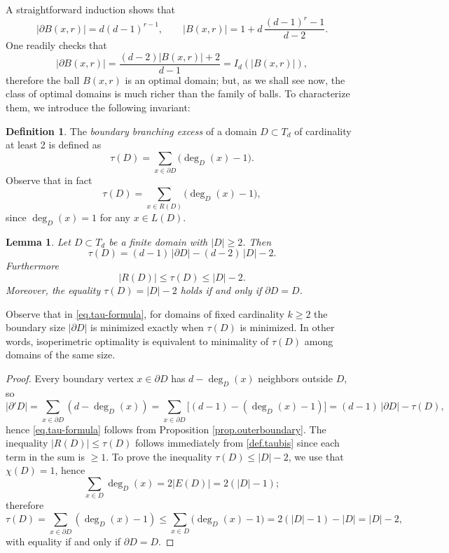 \documentclass[a4paper, 11pt]{article}
\numberwithin{equation}{section}
\newtheorem{lemma}[theorem]{Lemma}
\theoremstyle{definition}
\newtheorem{definition}[theorem]{Definition}
\theoremstyle{remark}
\begin{document}
A straightforward induction shows that
\[
|\partial B(x,r)| = d(d-1)^{r-1}, \qquad |B(x,r)| = 1 + d\,\frac{(d-1)^r - 1}{d-2}.
\]
One readily checks that
\[
|\partial B(x,r)| = \frac{(d-2)|B(x,r)| + 2}{d-1} = I_d\left( |B(x,r)| \right), 
\]
therefore the ball $B(x,r)$ is an optimal domain; but, as we shall see now, the class of optimal domains is much richer than the family of balls. To characterize them, we introduce the following invariant:
\begin{definition}
The \emph{boundary branching excess} of a domain $D\subset T_d$ of cardinality at least 2 is defined as 
\begin{equation}\label{def.tau}
  \tau(D) = \sum_{x\in\partial D} \bigl(\deg_D(x)-1\bigr).
\end{equation}
Observe that in fact 
\begin{equation}\label{def.taubis}
  \tau(D) = \sum_{x\in R(D)} \bigl(\deg_D(x)-1\bigr),
\end{equation}
since $\deg_D(x) = 1$ for any $x\in L(D)$.
\end{definition}

 
\medskip 

\begin{lemma}\label{lem.tau-formula}
Let $D\subset T_d$ be a finite  domain with $|D| \geq 2$. Then
\begin{equation}\label{eq.tau-formula}
  \tau(D)  = (d-1)\,|\partial D| - (d-2)\,|D| - 2.
\end{equation}
Furthermore 
\begin{equation}\label{inequtau1}
  |R(D)| \leq  \tau(D)  \leq |D| -2.
\end{equation}
Moreover, the equality $\tau(D)  =  |D| -2$ holds  if and only if $\partial D=D$.
\end{lemma}


\smallskip 

Observe that in \eqref{eq.tau-formula}, for domains of fixed cardinality  $k \geq 2$ the boundary size $|\partial D|$ is  minimized exactly when $\tau(D)$ is minimized. In other words, isoperimetric optimality is equivalent to minimality of $\tau(D)$ among domains of the same size.



\begin{proof}   Every boundary vertex $x\in\partial D$ has $d-\deg_D(x)$
neighbors outside $D$, so
\[
  |\partial' D| = \sum_{x\in\partial D} (d-\deg_D(x))
    = \sum_{x\in\partial D} \bigl[(d-1) - (\deg_D(x)-1)\bigr]
    = (d-1)\,|\partial D| - \tau(D),
\]
hence \eqref{eq.tau-formula} follows from Proposition \ref{prop.outerboundary}.
The inequality $|R(D)| \leq  \tau(D)$ follows immediately from \eqref{def.taubis} since each term in the sum is $\geq1$.  To prove the inequality   $\tau(D)  \leq |D| -2$, we use that $ \chi(D) = 1$, hence 
$$
 \sum_{x\in D}\deg_D(x)=2|E(D)|=2(|D|-1);
$$
therefore  
$$
 \tau(D)   = \sum_{x\in \partial D} (\deg_D(x)-1) \leq \sum_{x\in D}\bigl(\deg_D(x)-1\bigr) =2(|D|-1)-|D| =|D|-2,
$$
with equality  if and only if $\partial D=D$.
\end{proof}
\end{document}
